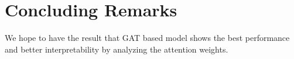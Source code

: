 \documentclass [11pt]{article}
\begin{document}
\section{Concluding Remarks}

We hope to have the result that GAT based model shows the best performance and better interpretability by analyzing the attention weights.



\end{document}
